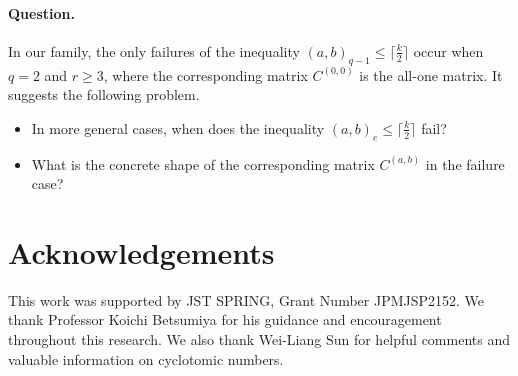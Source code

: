 \documentclass[10pt,a4paper]{article}
\numberwithin{equation}{section}
\begin{document}
\paragraph{Question.}
In our family, the only failures of the inequality $(a,b)_{q-1}\le \lceil \frac{k}{2}\rceil$ occur when $q=2$ and $r\ge 3$, where the corresponding matrix $C^{(0,0)}$ is the all-one matrix. It suggests the following problem.
\begin{itemize}[leftmargin=2em]
  \item In more general cases, when does the inequality $(a,b)_e\le \lceil \frac{k}{2}\rceil$ fail? 
  \item What is the concrete shape of the corresponding matrix $C^{(a,b)}$ in the failure case?
\end{itemize}

\section*{Acknowledgements}

This work was supported by JST SPRING, Grant Number JPMJSP2152. We thank Professor Koichi Betsumiya for his guidance and encouragement throughout this research. We also thank Wei-Liang Sun for helpful comments and valuable information on cyclotomic numbers.
\end{document}
